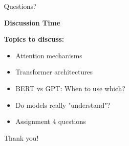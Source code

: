\documentclass[aspectratio=169]{beamer}
\begin{document}
\begin{frame}{Questions? 🙋}
\begin{center}
\LARGE
\textbf{Discussion Time}
\end{center}

\vspace{1em}

\textbf{Topics to discuss:}
\begin{itemize}\setlength{\itemsep}{0pt}
    \item Attention mechanisms
    \item Transformer architectures
    \item BERT vs GPT: When to use which?
    \item Do models really "understand"?
    \item Assignment 4 questions
\end{itemize}

\vspace{1em}

\begin{center}
\Large
Thank you! 🙏
\end{center}
\end{frame}
\end{document}
